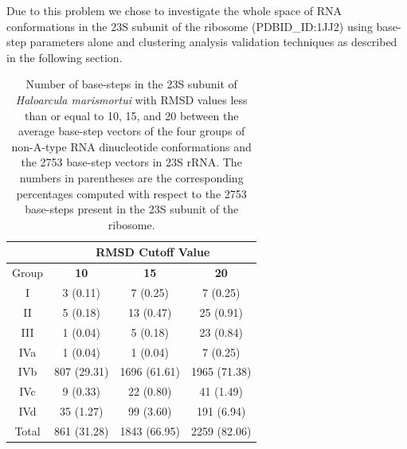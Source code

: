 Due to this  problem we chose to investigate the  whole space of RNA
conformations  in the  23S  subunit of  the ribosome  (PDBID\_ID:1JJ2)
using  base-step parameters alone  and clustering  analysis validation
techniques as described in the following section.

\begin{table}[htbp]
\begin{center}
{\footnotesize
\begin{tabular}{c|c|c|c}
\hline
 & \multicolumn{3}{c}{\bf{RMSD Cutoff Value}}\\ \hline
Group   & \bf{10} & \bf{15} & \bf{20}\\ \hline
I & 3 (0.11) & 7 (0.25) & 7 (0.25)\\ \hline
II & 5 (0.18) & 13 (0.47) & 25 (0.91)\\ \hline
III & 1 (0.04) & 5 (0.18) & 23 (0.84)\\ \hline
IVa & 1 (0.04) & 1 (0.04) & 7 (0.25)\\ \hline
IVb & 807 (29.31) & 1696 (61.61) & 1965 (71.38)\\ \hline
IVc & 9 (0.33) & 22 (0.80) & 41 (1.49)\\ \hline
IVd & 35 (1.27) & 99 (3.60) & 191 (6.94)\\ \hline \hline
Total & 861 (31.28) & 1843 (66.95) & 2259 (82.06)\\ \hline
\end{tabular}
}
\caption{Number of base-steps in the 23S subunit of \textit{Haloarcula
    marismortui} with RMSD values less than or equal to 10, 15, and 20
  between  the  average  base-step  vectors  of  the  four  groups  of
  non-A-type  RNA dinucleotide  conformations and  the  2753 base-step
  vectors  in   23S  rRNA.   The   numbers  in  parentheses   are  the
  corresponding  percentages   computed  with  respect   to  the  2753
  base-steps present in the 23S subunit of the ribosome.}
\label{tab:nonA}
\end{center}
\end{table}

